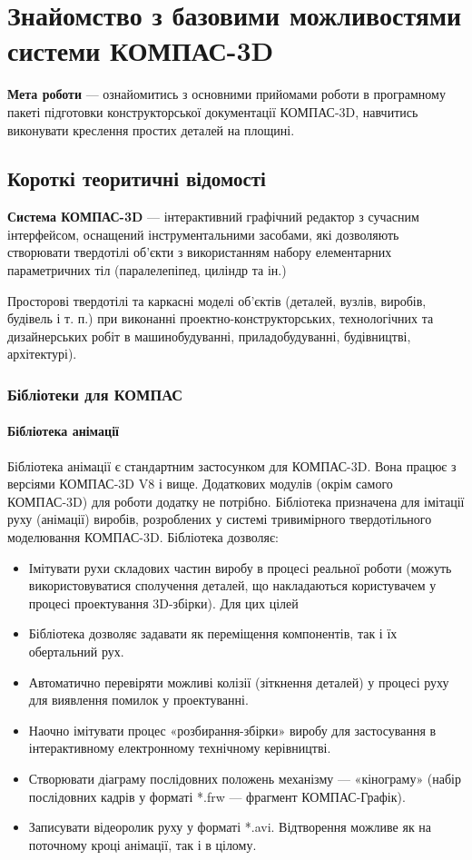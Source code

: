 \newpage\BorderFirstPage
\chapter[~]{Знайомство з базовими можливостями системи КОМПАС-3D}

\textbf{Мета роботи} --- ознайомитись з основними прийомами роботи в програмному пакеті підготовки
конструкторської документації КОМПАС-3D, навчитись виконувати креслення простих деталей на площині.

\section{Короткі теоритичні відомості}

\textbf{Система КОМПАС-3D} --- інтерактивний графічний редактор з сучасним інтерфейсом, оснащений
інструментальними засобами, які дозволяють створювати твердотілі об'єкти з використанням набору
елементарних параметричних тіл (паралелепіпед, циліндр та ін.)

Просторові твердотілі та каркасні моделі об'єктів (деталей, вузлів, виробів, будівель і т. п.) при
виконанні проектно-конструкторських, технологічних та дизайнерських робіт в машинобудуванні,
приладобудуванні, будівництві, архітектурі).

\subsection{Бібліотеки для КОМПАС}
\subsubsection{Бібліотека анімації}
Бібліотека анімації є стандартним застосунком для КОМПАС-3D. Вона працює з версіями КОМПАС-3D V8 і
вище. Додаткових модулів (окрім самого КОМПАС-3D) для роботи додатку не потрібно. Бібліотека
призначена для імітації руху (анімації) виробів, розроблених у системі тривимірного твердотільного
моделювання КОМПАС-3D. Бібліотека дозволяє:

\newpage\restoregeometry\BorderText
\begin{itemize}
\item Імітувати рухи складових частин виробу в процесі реальної роботи (можуть використовуватися
  сполучення деталей, що накладаються користувачем у процесі проектування 3D-збірки). Для цих цілей
\item Бібліотека дозволяє задавати як переміщення компонентів, так і їх обертальний рух.
\item Автоматично перевіряти можливі колізії (зіткнення деталей) у процесі руху для виявлення
  помилок у проектуванні.
\item Наочно імітувати процес «розбирання-збірки» виробу для застосування в інтерактивному
  електронному технічному керівництві.
\item Створювати діаграму послідовних положень механізму — «кінограму» (набір послідовних кадрів у
  форматі *.frw — фрагмент КОМПАС-Графік).
\item Записувати відеоролик руху у форматі *.avi. Відтворення можливе як на поточному кроці
  анімації, так і в цілому.
\end{itemize}

